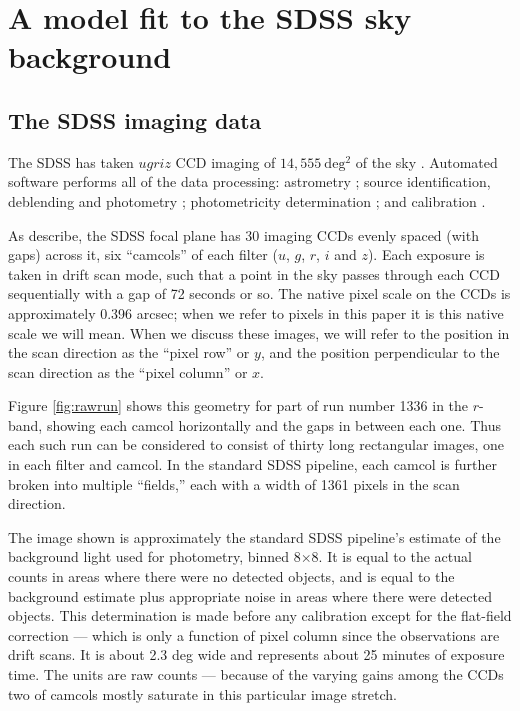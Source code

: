 \documentclass[10pt,preprint]{aastex}
\begin{document}
\section{A model fit to the SDSS sky background}
\label{sec:model}

\subsection{The SDSS imaging data}
\label{sec:data}

The SDSS has taken $ugriz$ CCD imaging of $14,555~\mathrm{deg^2}$ of
the sky \citep{york00a,aihara11a}.  Automated software performs all of
the data processing: astrometry \citep{pier03a}; source
identification, deblending and photometry \citep{lupton01a};
photometricity determination \citep{hogg01a}; and calibration
\citep{fukugita96a,smith02a, padmanabhan07b}.

As \citet{gunn05a} describe, the SDSS focal plane has 30 imaging CCDs
evenly spaced (with gaps) across it, six ``camcols'' of each filter
($u$, $g$, $r$, $i$ and $z$). Each exposure is taken in drift scan
mode, such that a point in the sky passes through each CCD
sequentially with a gap of 72 seconds or so.  The native pixel scale
on the CCDs is approximately 0.396 arcsec; when we refer to pixels in
this paper it is this native scale we will mean. When we discuss these
images, we will refer to the position in the scan direction as the
``pixel row'' or $y$, and the position perpendicular to the scan
direction as the ``pixel column'' or $x$.

Figure \ref{fig:rawrun} shows this geometry for part of run number
1336 in the $r$-band, showing each camcol horizontally and the gaps in
between each one. Thus each such run can be considered to consist of
thirty long rectangular images, one in each filter and camcol. In the
standard SDSS pipeline, each camcol is further broken into multiple
``fields,'' each with a width of 1361 pixels in the scan direction.

The image shown is approximately the standard SDSS pipeline's estimate
of the background light used for photometry, binned 8$\times$8. It is
equal to the actual counts in areas where there were no detected
objects, and is equal to the background estimate plus appropriate
noise in areas where there were detected objects. This determination
is made before any calibration except for the flat-field correction
--- which is only a function of pixel column since the observations
are drift scans.  It is about 2.3 deg wide and represents about 25
minutes of exposure time. The units are raw counts --- because of the
varying gains among the CCDs two of camcols mostly saturate in this
particular image stretch.
\end{document}
